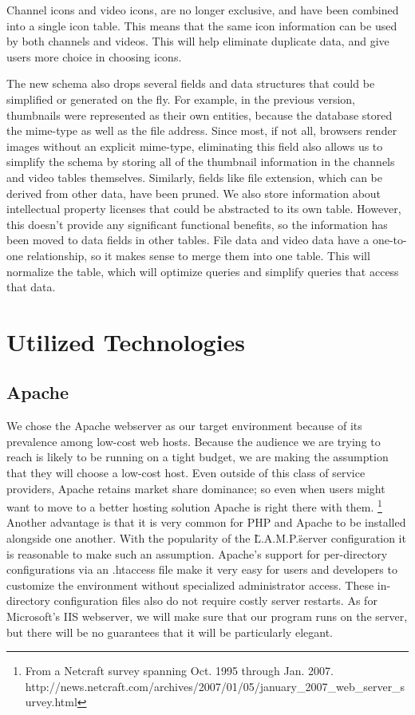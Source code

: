 \documentclass[a4paper,12pt]{report}
\begin{document}
Channel icons and video icons, are no longer exclusive, and have been combined into a single icon table.
This means that the same icon information can be used by both channels and videos. This will help eliminate duplicate data, and give users more choice in choosing icons.


The new schema also drops several fields and data structures that could be simplified or generated on the fly.
For example, in the previous version, thumbnails were represented as their own entities, because the database stored the mime-type as well as the file address.
Since most, if not all, browsers render images without an explicit mime-type, eliminating this field also allows us to simplify the schema by storing all of the thumbnail information in the channels and video tables themselves.
Similarly, fields like file extension, which can be derived from other data, have been pruned.
We also store information about intellectual property licenses that could be abstracted to its own table.
However, this doesn't provide any significant functional benefits, so the information has been moved to data fields in other tables. 
File data and video data have a one-to-one relationship, so it makes sense to merge them into one table.
This will normalize the table, which will optimize queries and simplify queries that access that data.


\chapter{Utilized Technologies}
\section{Apache}
We chose the Apache webserver as our target environment because of its prevalence among low-cost web hosts.
Because the audience we are trying to reach is likely to be running on a tight budget, we are making the assumption that they will choose a low-cost host.
Even outside of this class of service providers, Apache retains market share dominance; so even when users might want to move to a better hosting solution Apache is right there with them. \footnote{From a Netcraft survey spanning Oct. 1995 through Jan. 2007. http://news.netcraft.com/archives/2007/01/05/january\_2007\_web\_server\_survey.html}
Another advantage is that it is very common for PHP and Apache to be installed alongside one another.
With the popularity of the \"L.A.M.P.\" server configuration it is reasonable to make such an assumption.
Apache's support for per-directory configurations via an .htaccess file make it very easy for users and developers to customize the environment without specialized administrator access.
These in-directory configuration files also do not require costly server restarts.
As for Microsoft's IIS webserver, we will make sure that our program runs on the server, but there will be no guarantees that it will be particularly elegant.
\end{document}
